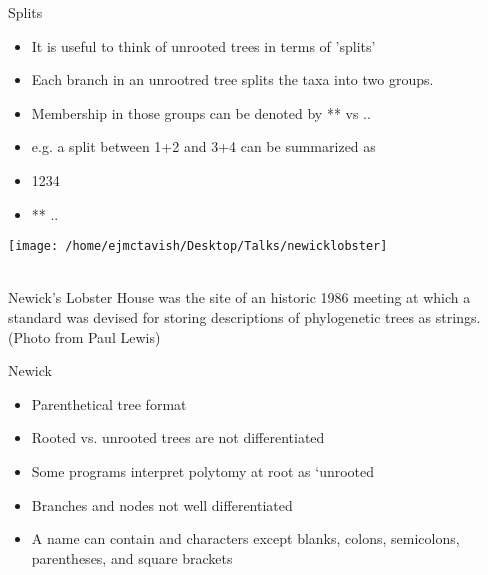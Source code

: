\documentclass{beamer}
\begin{document}
\begin{frame}
Splits\\
\begin{itemize}
 \item It is useful to think of unrooted trees in terms of 'splits'
 \item Each branch in an unrootred tree splits the taxa into two groups.
 \item Membership in those groups can be denoted by ** vs .. 
 \item e.g. a split between 1+2 and 3+4 can be summarized as
 \item 1234
 \item ** ..
\end{itemize}
\end{frame}





\begin{frame}
\end{frame}


\begin{frame}
\begin{centering}
\texttt{[image: /home/ejmctavish/Desktop/Talks/newicklobster]}
\end{centering}\\
 Newick’s Lobster House was the site of an historic 1986 meeting 
 at which a standard was devised for storing descriptions of 
 phylogenetic trees as strings. 
 (Photo from Paul Lewis)
\end{frame}






\begin{frame}
Newick\\
\begin{itemize}
 \item Parenthetical tree format
 \item Rooted vs. unrooted trees are not differentiated
 \item Some programs interpret polytomy at root as `unrooted
 \item Branches and nodes not well differentiated
 \item A name can contain and characters except blanks, colons, semicolons, parentheses, and square brackets
\end{itemize}
\end{frame}
\end{document}

